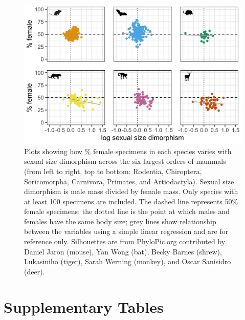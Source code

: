 \documentclass[a4paper, 12pt]{article}
\begin{document}
\begin{figure}
 \centering
  \includegraphics[width = \linewidth]{figures/ssd-orders-mammals.png}
  \caption{Plots showing how \% female specimens in each species varies with sexual size dimorphism across the six largest orders of mammals (from left to right, top to bottom: Rodentia, Chiroptera, Soricomorpha, Carnivora, Primates, and Artiodactyla). 
  Sexual size dimorphism is male mass divided by female mass. 
  Only species with at least 100 specimens are included. 
  The dashed line represents 50\% female specimens; the dotted line is the point at which males and females have the same body size; grey lines show relationship between the variables using a simple linear regression and are for reference only. 
  Silhouettes are from PhyloPic.org contributed by Daniel Jaron (mouse), Yan Wong (bat), Becky Barnes (shrew), Lukasiniho (tiger), Sarah Werning (monkey), and Oscar Sanisidro (deer).}
  \label{fig-mammal-ssd}
\end{figure}



\newpage
\section*{Supplementary Tables}



\newpage


\newpage

\end{document}
